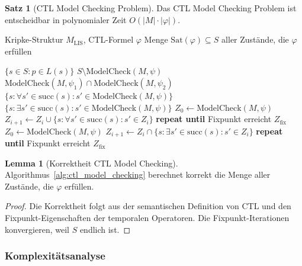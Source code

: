 \documentclass[a4paper,12pt]{article}
\theoremstyle{definition}
\newtheorem{satz}{Satz}
\newtheorem{lemma}{Lemma}
\begin{document}
\begin{satz}[CTL Model Checking Problem]
	\label{satz:ctl_model_checking}
	Das CTL Model Checking Problem ist entscheidbar in polynomialer Zeit $O(|M| \cdot |\varphi|)$.
\end{satz}

\begin{algorithm}[H]
\caption{Kripke Model Checking für CTL}
\label{alg:kripke}
\begin{algorithmic}[1]
    \Require Kripke-Struktur $M_{\text{LIS}}$, CTL-Formel $\varphi$
    \Ensure Menge $\text{Sat}(\varphi) \subseteq S$ aller Zustände, die $\varphi$ erfüllen
	
		\State \Return $\{s \in S : p \in L(s)\}$
	\ElsIf{$\varphi = \neg \psi$}
		\State \Return $S \setminus \text{ModelCheck}(M, \psi)$
		\State \Return $\text{ModelCheck}(M, \psi_1) \cap \text{ModelCheck}(M, \psi_2)$
		\State \Return $\{s : \forall s' \in \text{succ}(s): s' \in \text{ModelCheck}(M, \psi)\}$
		\State \Return $\{s : \exists s' \in \text{succ}(s): s' \in \text{ModelCheck}(M, \psi)\}$
		\State $Z_0 \leftarrow \text{ModelCheck}(M, \psi)$
		\State $Z_{i+1} \leftarrow Z_i \cup \{s : \forall s' \in \text{succ}(s): s' \in Z_i\}$
		\State \textbf{repeat until} Fixpunkt erreicht
		\State \Return $Z_{\text{fix}}$
		\State $Z_0 \leftarrow \text{ModelCheck}(M, \psi)$
		\State $Z_{i+1} \leftarrow Z_i \cap \{s : \exists s' \in \text{succ}(s): s' \in Z_i\}$
		\State \textbf{repeat until} Fixpunkt erreicht
		\State \Return $Z_{\text{fix}}$
	\EndIf
\end{algorithmic}
\end{algorithm}

\begin{lemma}[Korrektheit CTL Model Checking]
	\label{lem:ctl_mc_korrektheit}
	Algorithmus~\ref{alg:ctl_model_checking} berechnet korrekt die Menge aller Zustände, die $\varphi$ erfüllen.
\end{lemma}

\begin{proof}
	Die Korrektheit folgt aus der semantischen Definition von CTL und den Fixpunkt-Eigenschaften der temporalen Operatoren. Die Fixpunkt-Iterationen konvergieren, weil $S$ endlich ist.
\end{proof}

\subsubsection{Komplexitätsanalyse}
\end{document}
